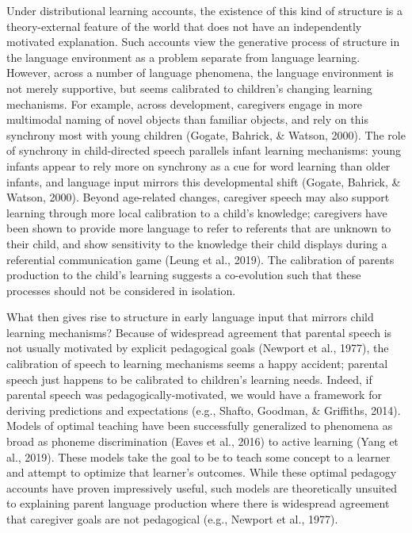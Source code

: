 \documentclass[english,,man,floatsintext]{apa6}
\begin{document}
Under distributional learning accounts, the existence of this kind of structure is a theory-external feature of the world that does not have an independently motivated explanation. Such accounts view the generative process of structure in the language environment as a problem separate from language learning. However, across a number of language phenomena, the language environment is not merely supportive, but seems calibrated to children's changing learning mechanisms. For example, across development, caregivers engage in more multimodal naming of novel objects than familiar objects, and rely on this synchrony most with young children (Gogate, Bahrick, \& Watson, 2000). The role of synchrony in child-directed speech parallels infant learning mechanisms: young infants appear to rely more on synchrony as a cue for word learning than older infants, and language input mirrors this developmental shift (Gogate, Bahrick, \& Watson, 2000). Beyond age-related changes, caregiver speech may also support learning through more local calibration to a child's knowledge; caregivers have been shown to provide more language to refer to referents that are unknown to their child, and show sensitivity to the knowledge their child displays during a referential communication game (Leung et al., 2019). The calibration of parents production to the child's learning suggests a co-evolution such that these processes should not be considered in isolation.

What then gives rise to structure in early language input that mirrors child learning mechanisms? Because of widespread agreement that parental speech is not usually motivated by explicit pedagogical goals (Newport et al., 1977), the calibration of speech to learning mechanisms seems a happy accident; parental speech just happens to be calibrated to children's learning needs. Indeed, if parental speech was pedagogically-motivated, we would have a framework for deriving predictions and expectations (e.g., Shafto, Goodman, \& Griffiths, 2014). Models of optimal teaching have been successfully generalized to phenomena as broad as phoneme discrimination (Eaves et al., 2016) to active learning (Yang et al., 2019). These models take the goal to be to teach some concept to a learner and attempt to optimize that learner's outcomes. While these optimal pedagogy accounts have proven impressively useful, such models are theoretically unsuited to explaining parent language production where there is widespread agreement that caregiver goals are not pedagogical (e.g., Newport et al., 1977).
\end{document}
